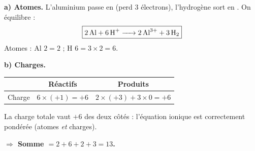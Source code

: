 \documentclass[11pt,a4paper]{article}
\newcommand{\rep}[1]{\par\smallskip\noindent\textbf{\color{corrcol}$\Rightarrow$ #1}}
\begin{document}
\begin{cor}
\textbf{a) Atomes.} L'aluminium passe en  (perd 3 électrons), l'hydrogène sort en .
On équilibre :
\[ \boxed{\ce{2 Al + 6 H+ -> 2 Al^3+ + 3 H2}} \]
Atomes : Al $2=2$ ; H $6=3\times2=6$. \checkmark

\textbf{b) Charges.}
\begin{center}\small
\begin{tabular}{lcc}
\toprule
 & Réactifs & Produits\\ \midrule
Charge & $6\times(+1)=+6$ & $2\times(+3)+3\times0=+6$\\
\bottomrule
\end{tabular}
\end{center}
La charge totale vaut $+6$ des deux côtés : l'équation ionique est correctement pondérée
(atomes \emph{et} charges).
\rep{Somme $=2+6+2+3=\boxed{13}$.}
\end{cor}
\end{document}
